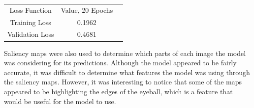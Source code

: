 \documentclass{article}[12pt]
\begin{document}
\begin{center}
    \begin{tabular}{|c|c|c|}
        Loss Function & Value, 20 Epochs\\
        Training Loss & 0.1962 \\
        Validation Loss & 0.4681 \\
    \end{tabular}
\end{center}

Saliency maps were also used to determine which parts of each image the model was considering for its predictions. Although the model appeared to be fairly accurate, it was difficult to determine what features the model was using through the saliency maps. However, it was interesting to notice that some of the maps appeared to be highlighting the edges of the eyeball, which is a feature that would be useful for the model to use.\\
\end{document}
